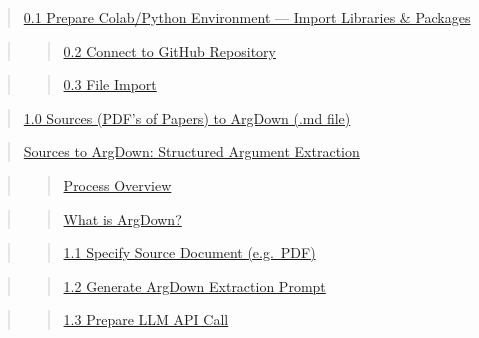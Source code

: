 \documentclass[
  letterpaper,
]{book}
\begin{document}
\begin{quote}
\hyperref[scrollTo=GtVFO-s74vI_]{0.1 Prepare Colab/Python Environment
--- Import Libraries \& Packages}
\end{quote}

\begin{quote}
\begin{quote}
\hyperref[scrollTo=2a3VR0fLhJow]{0.2 Connect to GitHub Repository}
\end{quote}
\end{quote}

\begin{quote}
\begin{quote}
\hyperref[scrollTo=y-ix4Rp5fE9m]{0.3 File Import}
\end{quote}
\end{quote}

\begin{quote}
\hyperref[scrollTo=52XyPlte5HrU]{1.0 Sources (PDF's of Papers) to
ArgDown (.md file)}
\end{quote}

\begin{quote}
\hyperref[scrollTo=1-7O4KHfNU-e]{Sources to ArgDown: Structured Argument
Extraction}
\end{quote}

\begin{quote}
\begin{quote}
\hyperref[scrollTo=1-7O4KHfNU-e]{Process Overview}
\end{quote}
\end{quote}

\begin{quote}
\begin{quote}
\hyperref[scrollTo=1-7O4KHfNU-e]{What is ArgDown?}
\end{quote}
\end{quote}

\begin{quote}
\begin{quote}
\hyperref[scrollTo=ESKnZ_4f_a6y]{1.1 Specify Source Document (e.g.~PDF)}
\end{quote}
\end{quote}

\begin{quote}
\begin{quote}
\hyperref[scrollTo=6ToQFra3_nl9]{1.2 Generate ArgDown Extraction Prompt}
\end{quote}
\end{quote}

\begin{quote}
\begin{quote}
\hyperref[scrollTo=pGv2KcZU_9Bn]{1.3 Prepare LLM API Call}
\end{quote}
\end{quote}
\end{document}
